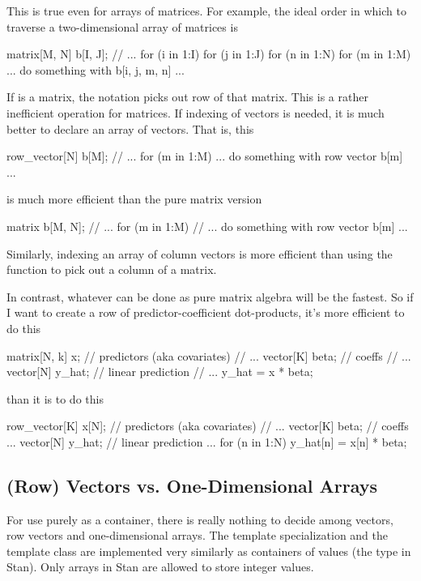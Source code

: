 This is true even for arrays of matrices.  For example, the ideal
order in which to traverse a two-dimensional array of matrices is
%
\begin{stancode}
matrix[M, N] b[I, J];
// ...
for (i in 1:I)
  for (j in 1:J)
    for (n in 1:N)
      for (m in 1:M)
        ... do something with b[i, j, m, n] ...
\end{stancode}

If  is a matrix, the notation  picks out row
 of that matrix.  This is a rather inefficient operation for
matrices.  If indexing of vectors is needed, it is much better to
declare an array of vectors.  That is, this
%
\begin{stancode}
row_vector[N] b[M];
// ...
for (m in 1:M)
   ... do something with row vector b[m] ...
\end{stancode}
%
is much more efficient than the pure matrix version
%
\begin{stancode}
matrix b[M, N];
// ...
for (m in 1:M)
   // ... do something with row vector b[m] ...
\end{stancode}
%
Similarly, indexing an array of column vectors is more efficient than
using the  function to pick out a column of a matrix.

In contrast, whatever can be done as pure matrix algebra will be the
fastest.  So if I want to create a row of predictor-coefficient
dot-products, it's more efficient to do this
%
\begin{stancode}
matrix[N, k] x;    // predictors (aka covariates)
// ...
vector[K] beta;   // coeffs
// ...
vector[N] y_hat;  // linear prediction
// ...
y_hat = x * beta;
\end{stancode}
%
than it is to do this
%
\begin{stancode}
row_vector[K] x[N];    // predictors (aka covariates)
// ...
vector[K] beta;   // coeffs
...
vector[N] y_hat;  // linear prediction
...
for (n in 1:N)
  y_hat[n] = x[n] * beta;
\end{stancode}

\subsection{(Row) Vectors vs. One-Dimensional Arrays}

For use purely as a container, there is really nothing to decide among
vectors, row vectors and one-dimensional arrays.  The
 template specialization and the
 template class are implemented very similarly as
containers of  values (the type  in Stan).
Only arrays in Stan are allowed to store integer values.



